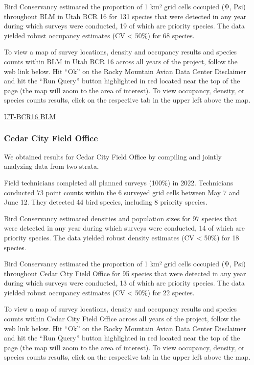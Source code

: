 \documentclass[
  letterpaper,
  DIV=11,
  numbers=noendperiod,
  oneside]{scrreprt}
\begin{document}
Bird Conservancy estimated the proportion of 1 km² grid cells occupied
(Ψ, Psi) throughout BLM in Utah BCR 16 for 131 species that were
detected in any year during which surveys were conducted, 19 of which
are priority species. The data yielded robust occupancy estimates (CV
\textless{} 50\%) for 68 species.

To view a map of survey locations, density and occupancy results and
species counts within BLM in Utah BCR 16 across all years of the
project, follow the web link below. Hit ``Ok'' on the Rocky Mountain
Avian Data Center Disclaimer and hit the ``Run Query'' button
highlighted in red located near the top of the page (the map will zoom
to the area of interest). To view occupancy, density, or species counts
results, click on the respective tab in the upper left above the map.

\href{http://www.rmbo.org/new_site/adc/QueryWindow.aspx\#N4IgzgrgDgpgTmALnAhoiBbEAuABCAVQBUBaAIQGEAlARgDZcyAZAWRAF8g=}{UT-BCR16
BLM}

\hypertarget{cedar-city-field-office}{%
\subsubsection{Cedar City Field Office}\label{cedar-city-field-office}}

We obtained results for Cedar City Field Office by compiling and jointly
analyzing data from two strata.

Field technicians completed all planned surveys (100\%) in 2022.
Technicians conducted 73 point counts within the 6 surveyed grid cells
between May 7 and June 12. They detected 44 bird species, including 8
priority species.

Bird Conservancy estimated densities and population sizes for 97 species
that were detected in any year during which surveys were conducted, 14
of which are priority species. The data yielded robust density estimates
(CV \textless{} 50\%) for 18 species.

Bird Conservancy estimated the proportion of 1 km² grid cells occupied
(Ψ, Psi) throughout Cedar City Field Office for 95 species that were
detected in any year during which surveys were conducted, 13 of which
are priority species. The data yielded robust occupancy estimates (CV
\textless{} 50\%) for 22 species.

To view a map of survey locations, density and occupancy results and
species counts within Cedar City Field Office across all years of the
project, follow the web link below. Hit ``Ok'' on the Rocky Mountain
Avian Data Center Disclaimer and hit the ``Run Query'' button
highlighted in red located near the top of the page (the map will zoom
to the area of interest). To view occupancy, density, or species counts
results, click on the respective tab in the upper left above the map.
\end{document}
